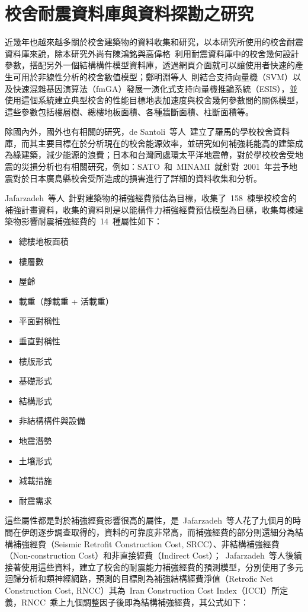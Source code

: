\section{校舍耐震資料庫與資料探勘之研究}

近幾年也越來越多關於校舍建築物的資料收集和研究，以本研究所使用的校舍耐震資料庫來說，除本研究外尚有陳鴻銘與高偉格\cite{chen2008computer}~利用耐震資料庫中的校舍幾何設計參數，搭配另外一個結構構件模型資料庫，透過網頁介面就可以讓使用者快速的產生可用於非線性分析的校舍數值模型；鄭明淵等人\cite{chen2012seismic}~則結合支持向量機（SVM）以及快速混雜基因演算法（fmGA）發展一演化式支持向量機推論系統（ESIS），並使用這個系統建立典型校舍的性能目標地表加速度與校舍幾何參數間的關係模型，這些參數包括樓層樹、總樓地板面積、各種牆斷面積、柱斷面積等。

除國內外，國外也有相關的研究，de Santoli~等人\cite{de2014energy}~建立了羅馬的學校校舍資料庫，而其主要目標在於分析現在的校舍能源效率，並研究如何補強耗能高的建築成為綠建築，減少能源的浪費；日本和台灣同處環太平洋地震帶，對於學校校舍受地震的災損分析也有相關研究，例如：SATO~和~MINAMI\cite{SATOShinji:2004-12}~就針對~2001~年芸予地震對於日本廣島縣校舍受所造成的損害進行了詳細的資料收集和分析。

Jafarzadeh~等人\cite{jafarzadeh2014seismic}~針對建築物的補強經費預估為目標，收集了~158~棟學校校舍的補強計畫資料，收集的資料則是以能構件力補強經費預估模型為目標，收集每棟建築物影響耐震補強經費的~14~種屬性如下：

  \begin{multicols}{2}
  \begin{itemize}
  \item 總樓地板面積
  \item 樓層數
  \item 屋齡
  \item 載重（靜載重 + 活載重）
  \item 平面對稱性
  \item 垂直對稱性
  \item 樓版形式
  \item 基礎形式
  \item 結構形式
  \item 非結構構件與設備
  \item 地震潛勢
  \item 土壤形式
  \item 減載措施
  \item 耐震需求
  \end{itemize}
  \end{multicols}

這些屬性都是對於補強經費影響很高的屬性\cite{jafarzadeh2012seismic}，是~Jafarzadeh~等人花了九個月的時間在伊朗逐步調查取得的，資料的可靠度非常高，而補強經費的部分則還細分為結構補強經費（Seismic Retrofit Construction Cost, SRCC）、非結構補強經費（Non-construction Cost）和非直接經費（Indirect Cost）；~Jafarzadeh~等人後續接著使用這些資料，建立了校舍的耐震能力補強經費的預測模型，分別使用了多元迴歸分析\cite{jafarzadeh2013predicting}和類神經網路\cite{jafarzadeh2013application}，預測的目標則為補強結構經費淨值（Retrofic Net Construction Cost, RNCC）其為~Iran Construction Cost Index（ICCI）所定義，RNCC~乘上九個調整因子後即為結構補強經費，其公式如下：

